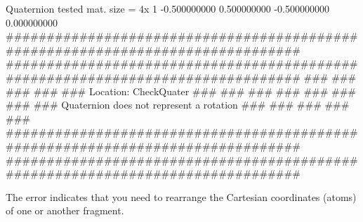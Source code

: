 \begin{itemize}
\begin{sourcelisting}
  Quaternion tested
  mat. size =     4x    1
   -0.500000000
    0.500000000
   -0.500000000
    0.000000000
 ###############################################################################
 ###############################################################################
 ###                                                                         ###
 ###                                                                         ###
 ###    Location: CheckQuater                                                ###
 ###                                                                         ###
 ###                                                                         ###
 ###                                                                         ###
 ###    Quaternion does not represent a rotation                             ###
 ###                                                                         ###
 ###                                                                         ###
 ###############################################################################
 ###############################################################################

\end{sourcelisting}

 The error indicates that you need to rearrange the Cartesian coordinates
 (atoms) of one or another fragment.

\end{itemize}
 
\clearpage

